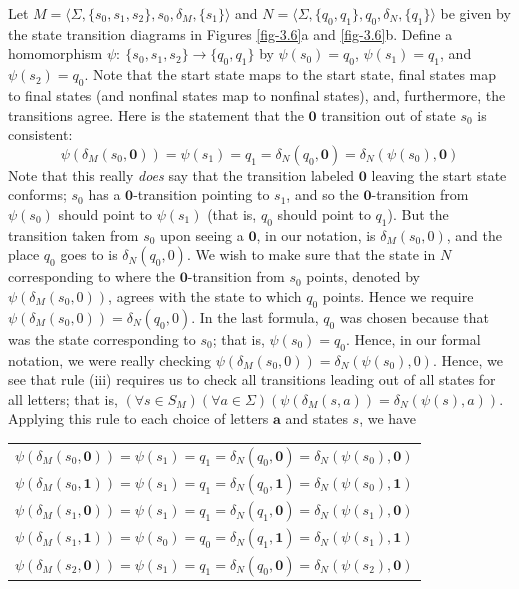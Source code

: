 Let $M =\langle\Sigma,\{s_0,s_1,s_2\},s_0,\delta_M,\{s_1\}\rangle$ and
$N =\langle\Sigma,\{q_0,q_1\},q_0,\delta_N,\{q_1\}\rangle$ be given by the state
transition diagrams in Figures \ref{fig-3.6}a and \ref{fig-3.6}b. Define a homomorphism
$\psi$$:\ \{s_0,s_1,s_2\}\rightarrow\{q_0,q_1\}$ by $\psi(s_0)=q_0$,
$\psi(s_1)=q_1$, and $\psi(s_2)=q_0$. Note that the start state maps to the
start state, final states map to final states (and nonfinal states map to
nonfinal states), and, furthermore, the transitions agree. Here is the statement
that the $\pmb{0}$ transition out of state $s_0$ is consistent:
\[ \psi(\delta_M(s_0,\pmb{0}))=\psi(s_1)=q_1=\delta_N(q_0,\pmb{0})=\delta_N(\psi(s_0),\pmb{0}) \]
Note that this really \emph{does} say that the transition labeled $\pmb{0}$
leaving the start state conforms; $s_0$ has a $\pmb{0}$-transition pointing to
$s_1$, and so the $\pmb{0}$-transition from $\psi(s_0)$ should point to $\psi(s_1)$
(that is, $q_0$ should point to $q_1$). But the transition taken from $s_0$
upon seeing a $\pmb{0}$, in our notation, is $\delta_M(s_0,0)$, and the place
$q_0$ goes to is $\delta_N(q_0,0)$. We wish to make sure that the state in $N$
corresponding to where the $\pmb{0}$-transition from $s_0$ points, denoted by
$\psi(\delta_M(s_0,0))$, agrees with the state to which $q_0$ points. Hence we
require $\psi(\delta_M(s_0,0)) = \delta_N(q_0,0)$. In the last formula, $q_0$ was
chosen because that was the state corresponding to $s_0$; that is,
$\psi(s_0)=q_0$. Hence, in our formal notation, we were really checking
$\psi(\delta_M(s_0,0)) = \delta_N(\psi(s_0),0)$. Hence, we see that rule (iii)
requires us to check all transitions leading out of all states for all letters;
that is, $(\forall s \in S_M)(\forall a \in \Sigma)(\psi(\delta_M(s,a)) =
\delta_N(\psi(s),a))$. Applying this rule to each choice of letters $\pmb{a}$ and
states $s$, we have
\begin{center}
\begin{tabular}{l}
$\psi(\delta_M(s_0,\pmb{0}))=\psi(s_1)=q_1=\delta_N(q_0,\pmb{0})=\delta_N(\psi(s_0),\pmb{0})$ \\
$\psi(\delta_M(s_0,\pmb{1}))=\psi(s_1)=q_1=\delta_N(q_0,\pmb{1})=\delta_N(\psi(s_0),\pmb{1})$ \\
$\psi(\delta_M(s_1,\pmb{0}))=\psi(s_1)=q_1=\delta_N(q_1,\pmb{0})=\delta_N(\psi(s_1),\pmb{0})$ \\
$\psi(\delta_M(s_1,\pmb{1}))=\psi(s_0)=q_0=\delta_N(q_1,\pmb{1})=\delta_N(\psi(s_1),\pmb{1})$ \\
$\psi(\delta_M(s_2,\pmb{0}))=\psi(s_1)=q_1=\delta_N(q_0,\pmb{0})=\delta_N(\psi(s_2),\pmb{0})$ \\

\end{tabular}
\end{center}$$
